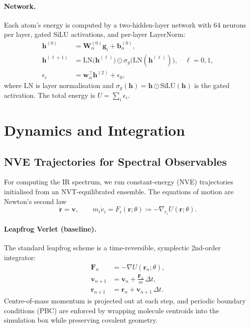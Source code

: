 \documentclass{article}
\begin{document}
\paragraph{Network.}
Each atom's energy is computed by a two-hidden-layer network with 64 neurons
per layer, gated SiLU activations, and per-layer LayerNorm:
\begin{align}
  \bm{h}^{(0)} &= \bm{W}^{(0)}_\alpha \bm{g}_i + \bm{b}^{(0)}_\alpha, \\
  \bm{h}^{(\ell+1)} &= \mathrm{LN}\!\bigl(\bm{h}^{(\ell)}\bigr)
    \odot \sigma_g\!\bigl(\mathrm{LN}(\bm{h}^{(\ell)})\bigr),
  \quad \ell=0,1, \\
  \epsilon_i &= \bm{w}_\alpha^\top \bm{h}^{(2)} + \epsilon_0,
\end{align}
where $\mathrm{LN}$ is layer normalisation and
$\sigma_g(\bm{h}) = \bm{h} \odot \mathrm{SiLU}(\bm{h})$ is the gated
activation.  The total energy is $U = \sum_i \epsilon_i$.

\section{Dynamics and Integration}
\label{sec:dynamics}

\subsection{NVE Trajectories for Spectral Observables}
\label{sec:nve}

For computing the IR spectrum, we run constant-energy (NVE) trajectories
initialised from an NVT-equilibrated ensemble.  The equations of motion are
Newton's second law
\begin{equation}
  \dot{\bm{r}} = \bm{v}, \qquad
  m_i \dot{v}_i = F_i(\bm{r};\theta) \coloneqq -\nabla_{r_i} U(\bm{r};\theta).
\end{equation}

\paragraph{Leapfrog Verlet (baseline).}
The standard leapfrog scheme is a time-reversible, symplectic 2nd-order
integrator:
\begin{align}
  \bm{F}_n &= -\nabla U(\bm{r}_n;\theta), \\
  \bm{v}_{n+1} &= \bm{v}_n + \frac{\bm{F}_n}{m}\,\Delta t, \\
  \bm{r}_{n+1} &= \bm{r}_n + \bm{v}_{n+1}\,\Delta t.
\end{align}
Centre-of-mass momentum is projected out at each step, and periodic boundary
conditions (PBC) are enforced by wrapping molecule centroids into the simulation
box while preserving covalent geometry.
\end{document}
